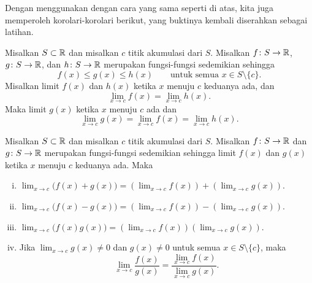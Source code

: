 Dengan menggunakan  dengan cara yang sama seperti di atas, kita juga memperoleh
korolari-korolari berikut, yang buktinya kembali diserahkan sebagai latihan.

\begin{cor} \label{fsqueeze:cor}
Misalkan $S \subset {\mathbb{R}}$ dan misalkan $c$ titik akumulasi dari $S$.
Misalkan $f \colon S \to {\mathbb{R}}$,
$g \colon S \to {\mathbb{R}}$, dan $h \colon S \to {\mathbb{R}}$ merupakan fungsi-fungsi sedemikian sehingga
\begin{equation*}
f(x) \leq g(x) \leq h(x) \qquad \text{untuk semua } x \in S \setminus \{ c \}.
\end{equation*}
Misalkan limit $f(x)$ dan $h(x)$ ketika $x$ menuju $c$ keduanya ada, dan
\begin{equation*}
\lim_{x\to c} f(x) = \lim_{x\to c} h(x) .
\end{equation*}
Maka limit $g(x)$ ketika $x$ menuju $c$ ada dan
\begin{equation*}
\lim_{x\to c} g(x) =
\lim_{x\to c} f(x) = \lim_{x\to c} h(x) .
\end{equation*}
\end{cor}

\begin{cor} \label{falg:cor}
Misalkan $S \subset {\mathbb{R}}$ dan misalkan $c$ titik akumulasi dari $S$.
Misalkan $f \colon S \to {\mathbb{R}}$ dan
$g \colon S \to {\mathbb{R}}$ merupakan fungsi-fungsi
sedemikian sehingga
limit $f(x)$ dan $g(x)$ ketika $x$ menuju $c$ keduanya ada.
Maka
\begin{enumerate}[(i)]
\item
$\displaystyle
\lim_{x\to c} \bigl(f(x)+g(x)\bigr) = \left(\lim_{x\to c} f(x)\right) + 
\left(\lim_{x\to c} g(x)\right) .
$
\item
$\displaystyle
\lim_{x\to c} \bigl(f(x)-g(x)\bigr) = \left(\lim_{x\to c} f(x)\right) -
\left(\lim_{x\to c} g(x)\right) .
$
\item
$\displaystyle
\lim_{x\to c} \bigl(f(x)g(x)\bigr) = \left(\lim_{x\to c} f(x)\right)
\left(\lim_{x\to c} g(x)\right) .
$
\item \label{falg:cor:iv} Jika
$\displaystyle \lim_{x\to c} g(x) \neq 0$
dan $g(x) \neq 0$ untuk semua $x \in S \setminus \{ c \}$, maka
\begin{equation*}
\lim_{x\to c} \frac{f(x)}{g(x)} =
\frac{\lim_{x\to c} f(x)}{\lim_{x\to c} g(x)} .
\end{equation*}
\end{enumerate}
\end{cor}

